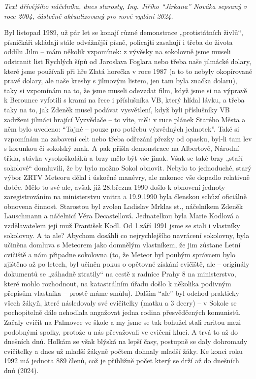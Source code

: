 \emph{Text dřívějšího náčelníka, dnes starosty, Ing. Jiřího ``Jirkana''
Nováka sepsaný v roce 2004, částečně aktualizovaný pro nové vydání
2024.}

Byl listopad 1989, už pár let se konají různé demonstrace „protistátních
živlů``, písničkáři skládají stále odvážnější písně, policajti zasahují
i třeba do života oddílu Jilm -- mám několik vzpomínek: z vývěsky na
sokolovně jsme museli odstranit list Rychlých šípů od Jaroslava Foglara
nebo třeba naše jilmácké dolary, které jsme používali při hře Zlatá
horečka v roce 1987 (a to to nebyly okopírované pravé dolary, ale naše
kresby s jilmovým listem, jen tam byla značka dolaru), taky si vzpomínám
na to, že jsme museli odevzdat film, když jsme si na výpravě k Berounce
vyfotili s krami na řece i příslušníka VB, který hlídal lávku, a třeba
taky na to, jak Zdeněk musel podávat vysvětlení, když byli příslušníky
VB zadrženi jilmáci hrající Vyzvědače -- to víte, měli v ruce plánek
Starého Města a něm bylo uvedeno: ``Tajné -- pouze pro potřebu
výzvědných jednotek''. Také si vzpomínám na zabavení celt nebo třeba
odřezání přezky od opasku, byl-li tam lev s korunkou či sokolský znak. A
pak přišla demonstrace na Albertově, Národní třída, stávka vysokoškoláků
a brzy mělo být vše jinak. Však se také brzy „staří sokolové``
domluvili, že by bylo možno Sokol obnovit. Nebylo to jednoduché, starý
výbor ZRTV Meteoru dělal i úskočné manévry, ale nakonec vše dopadlo
relativně dobře. Mělo to své ale, avšak již 28.března 1990 došlo k
obnovení jednoty zaregistrováním na ministerstvu vnitra a 19.9.1990 byla
členskou schůzí oficiálně obnovena činnost. Starostou byl zvolen
Ladislav Mrklas st., náčelníkem Zdeněk Lauschmann a náčelnicí Věra
Decastellová. Jednatelkou byla Marie Kodlová a vzdělavatelem její muž
František Kodl. Od 1.září 1991 jsme se stali i vlastníky sokolovny. A ta
ale? Abychom dosáhli co nejrychlejšího navrácení sokolovny, byla učiněna
domluva s Meteorem jako domnělým vlastníkem, že jim zůstane Letní
cvičiště a nám připadne sokolovna (to, že Meteor byl pouhým správcem
bylo zjištěno až po letech, byl učiněn pokus o opětovné získání
cvičiště, ale -- originály dokumentů se „záhadně ztratily`` na cestě z
radnice Prahy 8 na ministerstvo, které mohlo rozhodnout, na katastrálním
úřadu došlo k několika podivným přepisům vlastníka -- prostě máme
smůlu). Dalším ``ale'' byl odchod prakticky všech žákyň, které
následovaly své cvičitelky (matku a 3 dcery) -- v Sokole se pochopitelně
dále nehodlala angažovat jedna rodina přesvědčených komunistů. Začaly
cvičit na Palmovce ve škole a my jsme se tak bohužel stali raritou mezi
podobnými spolky, protože u nás převažovali ve cvičení kluci. A trvá to
až do dnešních dnů. Holkám se však blýská na lepší časy, postupně se
daly dohromady cvičitelky a dnes už mladší žákyně počtem dohnaly mladší
žáky. Ke konci roku 1992 má jednota 889 členů, což je přibližně počet
který se drží až do dnešních dnů (2024).

